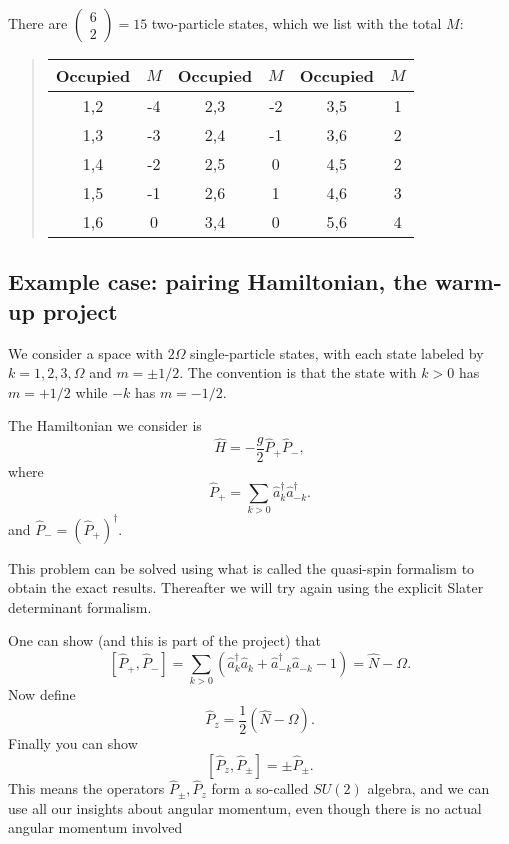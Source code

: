 \documentclass[%
twoside,                 %
final,                   %
10pt]{article}
\begin{document}
\noindent
There are $\left ( \begin{array}{c} 6 \\ 2 \end{array} \right) = 15$ two-particle states, 
which we list with the total $M$:


\begin{quote}
\begin{tabular}{cccccc}
\hline
\multicolumn{1}{c}{ Occupied } & \multicolumn{1}{c}{ $M$ } & \multicolumn{1}{c}{ Occupied } & \multicolumn{1}{c}{ $M$ } & \multicolumn{1}{c}{ Occupied } & \multicolumn{1}{c}{ $M$ } \\
\hline
1,2      & -4  & 2,3      & -2  & 3,5      & 1   \\
1,3      & -3  & 2,4      & -1  & 3,6      & 2   \\
1,4      & -2  & 2,5      & 0   & 4,5      & 2   \\
1,5      & -1  & 2,6      & 1   & 4,6      & 3   \\
1,6      & 0   & 3,4      & 0   & 5,6      & 4   \\
\hline
\end{tabular}
\end{quote}

\noindent




\subsection{Example case: pairing Hamiltonian, the warm-up project}


We consider a space with $2\Omega$ single-particle states, with each 
state labeled by 
$k = 1, 2, 3, \Omega$ and $m = \pm 1/2$. The convention is that 
the state with $k>0$ has $m = + 1/2$ while $-k$ has $m = -1/2$.


The Hamiltonian we consider is 
\[
\hat{H} = -\frac{g}{2} \hat{P}_+ \hat{P}_-,
\]
where
\[
\hat{P}_+ = \sum_{k > 0} \hat{a}^\dagger_k \hat{a}^\dagger_{-{k}}.
\]
and $\hat{P}_- = ( \hat{P}_+)^\dagger$.

This problem can be solved using what is called the quasi-spin formalism to obtain the 
exact results. Thereafter we will try again using the explicit Slater determinant formalism.




One can show (and this is part of the project) that
\[
\left [ \hat{P}_+, \hat{P}_- \right ] = \sum_{k> 0} \left( \hat{a}^\dagger_k \hat{a}_k 
+ \hat{a}^\dagger_{-{k}} \hat{a}_{-{k}} - 1 \right) = \hat{N} - \Omega.
\]
Now define 
\[
\hat{P}_z = \frac{1}{2} ( \hat{N} -\Omega).
\]
Finally you can show
\[
\left [ \hat{P}_z , \hat{P}_\pm \right ] = \pm \hat{P}_\pm.
\]
This means the operators $\hat{P}_\pm, \hat{P}_z$ form a so-called  $SU(2)$ algebra, and we can 
use all our insights about angular momentum, even though there is no actual 
angular momentum involved
\end{document}
